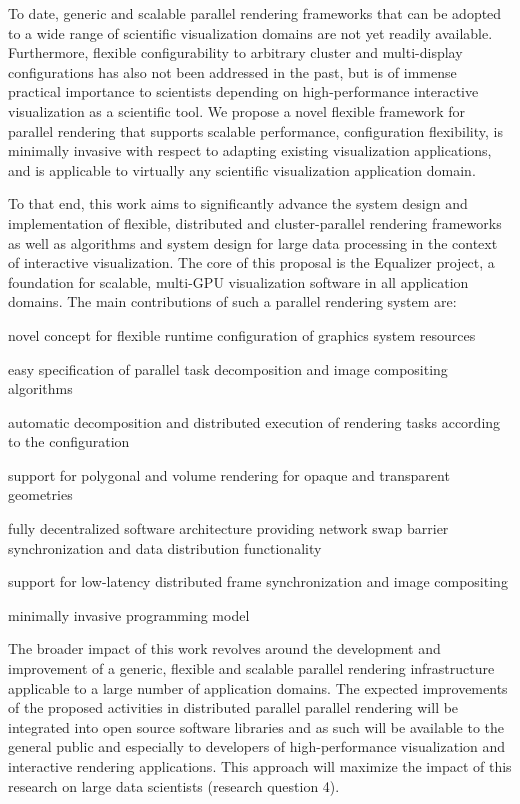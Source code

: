  To date, generic and scalable parallel rendering frameworks that can be adopted
 to a wide range of scientific visualization domains are not yet readily
 available. Furthermore, flexible configurability to arbitrary cluster and
 multi-display configurations has also not been addressed in the past, but is of
 immense practical importance to scientists depending on high-performance
 interactive visualization as a scientific tool. We propose a novel flexible
 framework for parallel rendering that supports scalable performance,
 configuration flexibility, is minimally invasive with respect to adapting
 existing visualization applications, and is applicable to virtually any
 scientific visualization application domain.

 To that end, this work aims to significantly advance the system design and
 implementation of flexible, distributed and cluster-parallel rendering
 frameworks as well as algorithms and system design for large data processing in
 the context of interactive visualization. The core of this proposal is the
 Equalizer project, a foundation for scalable, multi-GPU visualization software
 in all application domains. The main contributions of such a parallel rendering
 system are:
 \begin{compactenum}
  \item novel concept for flexible runtime configuration of graphics system resources
  \item easy specification of parallel task decomposition and image compositing algorithms
  \item automatic decomposition and distributed execution of rendering tasks according to the configuration
  \item support for polygonal and volume rendering for opaque and transparent geometries
  \item fully decentralized software architecture providing network swap barrier synchronization and data distribution functionality
  \item support for low-latency distributed frame synchronization and image compositing
  \item minimally invasive programming model
 \end{compactenum}

 The broader impact of this work revolves around the development and improvement
 of a generic, flexible and scalable parallel rendering infrastructure applicable
 to a large number of application domains. The expected improvements of the
 proposed activities in distributed parallel parallel rendering will be
 integrated into open source software libraries and as such will be available to
 the general public and especially to developers of high-performance
 visualization and interactive rendering applications. This approach will
 maximize the impact of this research on large data scientists (research question
 4).

